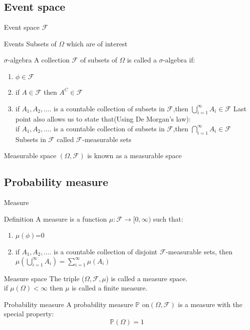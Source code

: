 \documentclass{beamer}
\begin{document}
\subsection{Event space}
\begin{frame}{Event space \(\mathcal{F}\)}
\begin{block}{Events}
Subsets of \(\Omega\) which are of interest
\end{block}
\begin{block}{\(\sigma\)-algebra}
A collection \(\mathcal{F}\) of subsets of \(\Omega\) is called a \(\sigma\)-algebra if:
\begin{enumerate}
    \item \(\phi \in \mathcal{F}\) 
    \item  if \( A \in \mathcal{F}\) then \(A^C \in \mathcal{F}\)
    \item if \(A_1,A_2,....\) is a countable collection of subsets in \(\mathcal{F}\),then
    \(\bigcup_{i=1}^{\infty} A_i \in \mathcal{F}\)
Last point also allows us to state that(Using De Morgan's law):\\
if \(A_1,A_2,....\) is a countable collection of subsets in \(\mathcal{F}\),then
    \(\bigcap_{i=1}^{\infty} A_i \in \mathcal{F}\)\\
Subsets in \(\mathcal{F}\) called \(\mathcal{F}\)-measurable sets   
\end{enumerate}
\end{block}
\begin{block}{Measurable space}
     \((\Omega,\mathcal{F})\) is known as a measurable space
\end{block}
\end{frame}
\subsection{Probability measure}
\begin{frame}{Measure}
\begin{block}{Definition}
A measure is a function \(\mu:\mathcal{F}\to[0,\infty)\) such that:
\begin{enumerate}
    \item \(\mu(\phi)\)=0
    \item if \(A_1,A_2,....\) is a countable collection of disjoint \(\mathcal{F}\)-measurable sets, then
    \(\mu(\bigcup_{i=1}^{\infty} A_i)=\sum_{i=1}^{\infty} \mu(A_i)\)
\end{enumerate}
\end{block}
\begin{block}{Measure space}
The triple (\(\Omega,\mathcal{F},\mu\)) is called a measure space.\\
if \(\mu(\Omega)<\infty\) then \(\mu\) is called a finite measure.\\
\end{block}
\begin{block}{Probability measure}
 A probability measure \(\mathbb{P}\) on\((\Omega,\mathcal{F})\) is a measure with the special property:
 \[\mathbb{P}(\Omega)=1\]
\end{block}
\end{frame}
\end{document}

